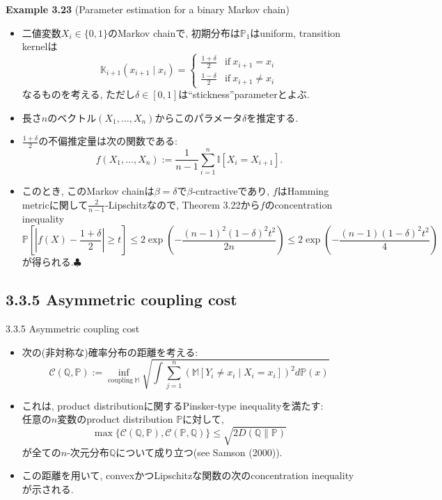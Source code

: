 \documentclass[aspectratio=169, dvipdfmx]{beamer}
\def\endexample{\hfill $\clubsuit$}
\newcommand{\bb}{\mathbb}
\newcommand{\cc}{\mathcal}
\begin{document}
\begin{frame}{}{}
{\bf Example 3.23} (Parameter estimation for a binary Markov chain)
\begin{itemize}
    \item 二値変数$X_i \in \{0, 1\}$のMarkov chainで, 
    初期分布は$\bb{P}_1$はuniform,
    transition kernelは
    \[
        \bb{K}_{i+1}(x_{i+1}\mid x_i)
        = \begin{cases}
            \frac{1+\delta}{2} &\mathrm{if\ } x_{i+1} = x_{i}\\
            \frac{1-\delta}{2} &\mathrm{if\ } x_{i+1} \ne x_{i}
          \end{cases}
    \]
    なるものを考える, ただし$\delta \in [0, 1]$は``stickness''parameterとよぶ.
    \item 長さ$n$のベクトル$(X_1, \dots, X_n)$からこのパラメータ$\delta$を推定する.
    \item $\frac{1+\delta}{2}$の不偏推定量は次の関数である:
          \[
              f(X_1,\dots,X_n)
              := \frac{1}{n-1}\sum_{i=1}^n \bb{I}[X_i = X_{i+1}].
          \]
    \item このとき, このMarkov chainは$\beta = \delta$で$\beta$-cntractiveであり,
    $f$はHamming metricに関して$\frac{2}{n-1}$-Lipschitzなので,
    Theorem 3.22から$f$のconcentration inequality
          {\small \[
              \bb{P}\left[\left|f(X) - \frac{1+\delta}{2}\right| \ge t\right]
              \le 2 \exp\left(- \frac{(n-1)^2(1-\delta)^2 t^2}{2n}\right)
              \le 2 \exp\left(-\frac{(n-1)(1-\delta)^2 t^2}{4}\right)
              \tag{3.70}
              \label{3.70}
          \]}
          が得られる.\endexample
\end{itemize}
\end{frame}

\subsection{3.3.5 Asymmetric coupling cost}
\begin{frame}{3.3.5 Asymmetric coupling cost}
    \begin{itemize}
        \item 次の(非対称な)確率分布の距離を考える:
        \[
            \cc{C}(\bb{Q}, \bb{P}) 
            := \inf_{\mathrm{coupling\ }\bb{M}}\sqrt{\int\sum_{j=1}^n\left( \bb{M}[Y_i \ne x_i \mid X_i = x_i] \right)^2 d\bb{P}(x)}
            \tag{3.71}\label{3.71}
        \]
        \item これは, product distributionに関するPinsker-type inequalityを満たす:\\
              任意の$n$変数のproduct distribution $\bb{P}$に対して,
              \[
                  \max\{\cc{C}(\bb{Q}, \bb{P}), \cc{C}(\bb{P}, \bb{Q})\}
                  \le \sqrt{2 D(\bb{Q} \| \bb{P})}
                  \label{3.73}\tag{3.73}
              \]
              が全ての$n$-次元分布$\bb{Q}$について成り立つ(see Samson (2000)).
        \item この距離を用いて, convexかつLipschitzな関数の次のconcentration inequalityが示される.
    \end{itemize}
\end{frame}
\end{document}
